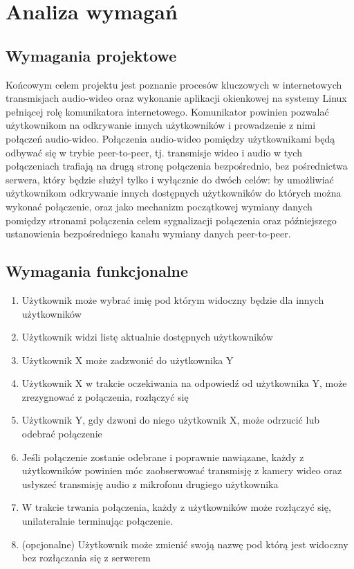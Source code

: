 \chapter{Analiza wymagań}

\section{Wymagania projektowe}

Końcowym celem projektu jest poznanie procesów kluczowych w internetowych transmisjach audio-wideo
oraz wykonanie aplikacji okienkowej na systemy Linux pełniącej rolę komunikatora internetowego.
Komunikator powinien pozwalać użytkownikom na odkrywanie innych użytkowników i prowadzenie z nimi
połączeń audio-wideo. Połączenia audio-wideo pomiędzy użytkownikami będą odbywać się w trybie
peer-to-peer, tj. transmisje wideo i audio w tych połączeniach trafiają na drugą stronę połączenia
bezpośrednio, bez pośrednictwa serwera, który będzie służył tylko i wyłącznie do dwóch celów: by
umożliwiać użytkownikom odkrywanie innych dostępnych użytkowników do których można wykonać
połączenie, oraz jako mechanizm początkowej wymiany danych pomiędzy stronami połączenia celem
sygnalizacji połączenia oraz późniejszego ustanowienia bezpośredniego kanału wymiany danych
peer-to-peer.

\section{Wymagania funkcjonalne}

\begin{enumerate}
	\item Użytkownik może wybrać imię pod którym widoczny będzie dla innych użytkowników
	\item Użytkownik widzi listę aktualnie dostępnych użytkowników
	\item Użytkownik X może zadzwonić do użytkownika Y
	\item Użytkownik X w trakcie oczekiwania na odpowiedź od użytkownika Y, może zrezygnować z
	      połączenia, rozłączyć się
	\item Użytkownik Y, gdy dzwoni do niego użytkownik X, może odrzucić lub odebrać połączenie
	\item Jeśli połączenie zostanie odebrane i poprawnie nawiązane, każdy z użytkowników powinien
	      móc zaobserwować transmisję z kamery wideo oraz usłyszeć transmisję audio z mikrofonu
	      drugiego użytkownika
	\item W trakcie trwania połączenia, każdy z użytkowników może rozłączyć się, unilateralnie
	      terminując połączenie.
	\item (opcjonalne) Użytkownik może zmienić swoją nazwę pod którą jest widoczny bez rozłączania
	      się z serwerem
\end{enumerate}

